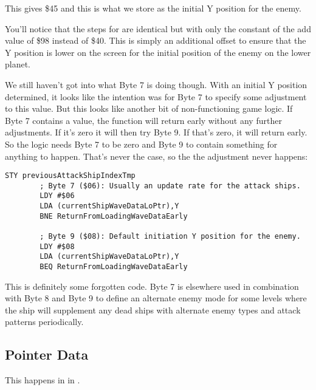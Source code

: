 This gives \$45 and this is what we store as the initial Y position for the enemy.

You'll notice that the steps for  are identical but with only the constant of the
add value of \$98 instead of \$40. This is simply an additional offset to ensure that the Y position is lower on the screen
for the initial position of the enemy on the lower planet.

We still haven't got into what Byte 7 is doing though. With an initial Y position determined, it looks like the intention was
for Byte 7 to specify some adjustment to this value. But this looks like another bit of non-functioning game logic. If
Byte 7 contains a value, the function will return early without any further adjustments. If it's zero it will then try
Byte 9. If that's zero, it will return early. So the logic needs Byte 7 to be zero and Byte 9 to contain something for 
anything to happen. That's never the case, so the the adjustment never happens:

\begin{lstlisting}[caption= An adjustment that never happens. Byte 7 and Byte 9 are never set in this way.]
        STY previousAttackShipIndexTmp
        ; Byte 7 ($06): Usually an update rate for the attack ships.
        LDY #$06
        LDA (currentShipWaveDataLoPtr),Y
        BNE ReturnFromLoadingWaveDataEarly

        ; Byte 9 ($08): Default initiation Y position for the enemy. 
        LDY #$08
        LDA (currentShipWaveDataLoPtr),Y
        BEQ ReturnFromLoadingWaveDataEarly
\end{lstlisting}

This is definitely some forgotten code. Byte 7 is elsewhere used in combination with Byte 8 and Byte 9 to define an alternate
enemy mode for some levels where the ship will supplement any dead ships with alternate enemy types and attack patterns periodically.


\subsection{Pointer Data}
This happens in  in . 


